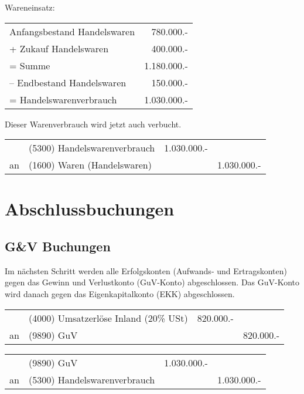 \documentclass[parskip=half,12pt,a4paper]{scrartcl}
\begin{document}
Wareneinsatz:

\begin{center}
	\begin{tabular}{lr}
		Anfangsbestand Handelswaren & 780.000.-\\
		+ Zukauf Handelswaren & 400.000.-\\
		\midrule
		= Summe & 1.180.000.-\\
		-- Endbestand Handelswaren & 150.000.-\\
		\midrule
		= Handelswarenverbrauch & 1.030.000.-\\
		\bottomrule
	\end{tabular}
\end{center}

Dieser Warenverbrauch wird jetzt auch verbucht.

\begin{center}
\begin{tabularx}{\textwidth}{rXrr}
 \toprule
    & (5300) Handelswarenverbrauch & 1.030.000.- &\\
 an & (1600) Waren (Handelswaren) & & 1.030.000.-\\
\bottomrule
\end{tabularx}
\end{center}

\section{Abschlussbuchungen}
\subsection{G\&V Buchungen}

Im nächsten Schritt werden alle Erfolgskonten (Aufwands- und Ertragskonten) gegen das Gewinn und Verlustkonto (GuV-Konto) abgeschlossen. Das GuV-Konto wird danach gegen das Eigenkapitalkonto (EKK) abgeschlossen.

\begin{center}
	\begin{tabularx}{\textwidth}{rXrr}
		\toprule
		& (4000) Umsatzerlöse Inland (20\% USt) & 820.000.- &\\
		an & (9890) GuV & & 820.000.-\\
		\bottomrule
	\end{tabularx}
\end{center}

\begin{center}
	\begin{tabularx}{\textwidth}{rXrr}
		\toprule
		& (9890) GuV & 1.030.000.- &\\
		an & (5300) Handelswarenverbrauch & & 1.030.000.-\\
		\bottomrule
	\end{tabularx}
\end{center}
\end{document}
